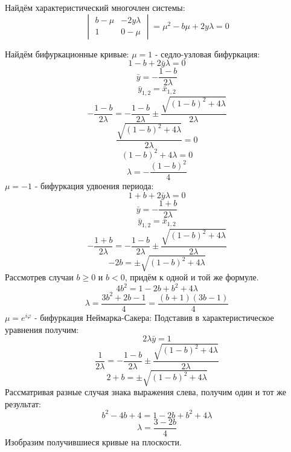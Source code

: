 \documentclass[12pt, a4paper]{article}
\begin{document}
Найдём характеристический многочлен системы:
\begin{equation*}
	\begin{vmatrix}
		b - \mu & -2y\lambda \\
		1 & 0 - \mu
	\end{vmatrix} =
	\mu^2 - b\mu + 2y\lambda = 0
\end{equation*}

Найдём бифуркационные кривые:
\newline
$\mu = 1$ - седло-узловая бифуркация:
\[ 1 - b + 2 \bar y \lambda = 0 \]
\[ \bar y = - \frac{1 - b}{2\lambda} \]
\[ \bar y_{1,2} = \bar x_{1, 2} \]
\[ - \frac{1 - b}{2\lambda} =  - \frac{1 - b}{2 \lambda} \pm \frac{\sqrt{(1 - b)^2 + 4 \lambda}}{2 \lambda} \]
\[ \frac{\sqrt{(1 - b)^2 + 4 \lambda}}{2 \lambda} = 0 \] 
\[ (1 - b)^2 + 4 \lambda = 0 \]
\[ \lambda = -\frac{(1 - b)^2}{4} \] 
\newline
$\mu = -1$ - бифуркация удвоения периода:
\[ 1 + b + 2 \bar y \lambda = 0 \]
\[ \bar y = - \frac{1 + b}{2\lambda} \]
\[ \bar y_{1,2} = \bar x_{1, 2} \]
\[ - \frac{1 + b}{2\lambda} =  - \frac{1 - b}{2 \lambda} \pm \frac{\sqrt{(1 - b)^2 + 4 \lambda}}{2 \lambda} \]
\[ -2b = \pm \sqrt{(1 - b)^2 + 4 \lambda} \]
Рассмотрев случаи $b \geq 0$ и $b < 0$, придём к одной и той же формуле.
\[ 4b^2 = 1 - 2b + b^2 + 4\lambda \]
\[ \lambda = \frac{3b^2 + 2b - 1}{4} = \frac{(b + 1)(3b - 1)}{4} \]
\newline
$\mu = e^{i\varphi}$ - бифуркация Неймарка-Сакера:
\newline 
Подставив в характеристическое уравнения получим:
\[ 2\lambda \bar y = 1 \]
\[ \frac{1}{2\lambda} = - \frac{1 - b}{2 \lambda} \pm \frac{\sqrt{(1 - b)^2 + 4 \lambda}}{2 \lambda} \]
\[ 2 + b = \pm \sqrt{(1 - b)^2 + 4 \lambda} \]
Рассматривая разные случая знака выражения слева, получим один и тот же результат:
\[ b^2 - 4b + 4 = 1 - 2b + b^2 + 4\lambda \]
\[ \lambda = \frac{3 - 2b}{4} \]
Изобразим получившиеся кривые на плоскости.
\end{document}
